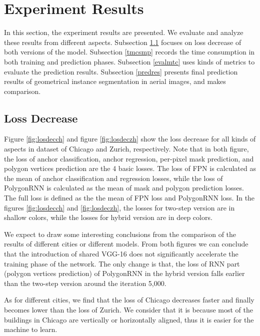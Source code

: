 \section{Experiment Results}\label{expres}
In this section, the experiment results are presented. We evaluate and analyze these results from different aspects. Subsection \ref{lossdec} focuses on loss decrease of both versions of the model. Subsection \ref{tmcsmp} records the time consumption in both training and prediction phases. Subsection \ref{evalmtc} uses kinds of metrics to evaluate the prediction results. Subsection \ref{predres} presents final prediction results of geometrical instance segmentation in aerial images, and makes comparison.

\subsection{Loss Decrease}\label{lossdec}
Figure \ref{fig:losdecch} and figure \ref{fig:losdeczh} show the loss decrease for all kinds of aspects in dataset of Chicago and Zurich, respectively. Note that in both figure, the loss of anchor classification, anchor regression, per-pixel mask prediction, and polygon vertices prediction are the 4 basic losses. The loss of FPN is calculated as the mean of anchor classification and regression losses, while the loss of PolygonRNN is calculated as the mean of mask and polygon prediction losses. The full loss is defined as the the mean of FPN loss and PolygonRNN loss. In the figures \ref{fig:losdecch} and \ref{fig:losdeczh}, the losses for two-step version are in shallow colors, while the losses for hybrid version are in deep colors.




We expect to draw some interesting conclusions from the comparison of the results of different cities or different models. From both figures we can conclude that the introduction of shared VGG-16 does not significantly accelerate the training phase of the network. The only change is that, the loss of RNN part (polygon vertices prediction) of PolygonRNN in the hybrid version falls earlier than the two-step version around the iteration 5,000.

As for different cities, we find that the loss of Chicago decreases faster and finally becomes lower than the loss of Zurich. We consider that it is because most of the buildings in Chicago are vertically or horizontally aligned, thus it is easier for the machine to learn.

